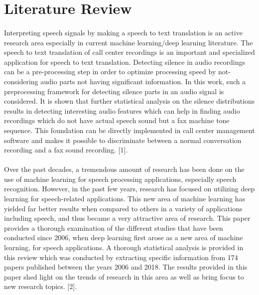 \section{Literature Review}

\paragraph{}Interpreting speech signals by making a speech to text translation is an active research area especially in current machine learning/deep learning literature. The speech to text translation of call center recordings is an important and specialized application for speech to text translation. Detecting silence in audio recordings can be a pre-processing step in order to optimize processing speed by not-considering audio parts not having significant information. In this work, such a preprocessing framework for detecting silence parts in an audio signal is considered. It is shown that further statistical analysis on the silence distributions results in detecting interesting audio features which can help in finding audio recordings which do not have actual speech sound but a fax machine tone sequence. This foundation can be directly implemented in call center management software and makes it possible to discriminate between a normal conversation recording and a fax sound recording. [1].

\paragraph{}Over the past decades, a tremendous amount of research has been done on the use of machine learning for speech processing applications, especially speech recognition. However, in the past few years, research has focused on utilizing deep learning for speech-related applications. This new area of machine learning has yielded far better results when compared to others in a variety of applications including speech, and thus became a very attractive area of research. This paper provides a thorough examination of the different studies that have been conducted since 2006, when deep learning first arose as a new area of machine learning, for speech applications. A thorough statistical analysis is provided in this review which was conducted by extracting specific information from 174 papers published between the years 2006 and 2018. The results provided in this paper shed light on the trends of research in this area as well as bring focus to new research topics. [2].

